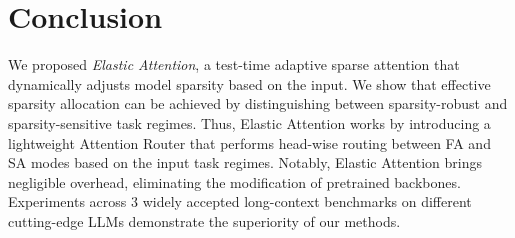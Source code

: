 \section{Conclusion}
\label{sec:conclusion}
We proposed \emph{Elastic Attention}, a test-time adaptive sparse attention that dynamically adjusts model sparsity based on the input. 
We show that effective sparsity allocation can be achieved by distinguishing between sparsity-robust and sparsity-sensitive task regimes.
Thus, Elastic Attention works by introducing a lightweight Attention Router that performs head-wise routing between FA and SA modes based on the input task regimes.
Notably, Elastic Attention brings negligible overhead, eliminating the modification of pretrained backbones.
Experiments across 3 widely accepted long-context benchmarks on different cutting-edge LLMs demonstrate the superiority of our methods.